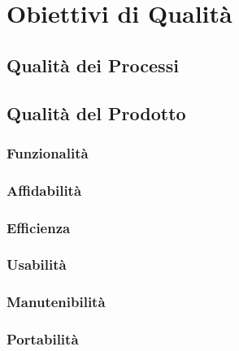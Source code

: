 \section{Obiettivi di Qualità}
\subsection{Qualità dei Processi}
\subsection{Qualità del Prodotto}
\subsubsection{Funzionalità}
\subsubsection{Affidabilità}
\subsubsection{Efficienza}
\subsubsection{Usabilità}
\subsubsection{Manutenibilità}
\subsubsection{Portabilità}
